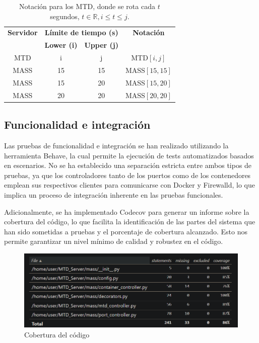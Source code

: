 \begin{table}[h!]
    \centering
    \begin{tabular}{|c|cc|c|}
        \hline
        \textbf{Servidor} & \multicolumn{2}{c|}{\textbf{Límite de tiempo (s)}} & \textbf{Notación} \\ 
        \cline{2-3}
        & \textbf{Lower (i)} & \textbf{Upper (j)} & \\ 
        \hline
        MTD & i & j & MTD$[i,j]$ \\ 
        MASS & 15 & 15 & MASS$[15,15]$ \\ 
        MASS & 15 & 20 & MASS$[15,20]$ \\ 
        MASS & 20 & 20 & MASS$[20,20]$ \\ 
        \hline
    \end{tabular}
    \caption{Notación para los MTD, donde se rota cada $t$ segundos, $t \in \mathbb{R}, i \leq t \leq j$.}
\end{table}

    
\subsection{Funcionalidad e integración}
Las pruebas de funcionalidad e integración se han realizado utilizando la herramienta Behave, la cual permite la ejecución de tests automatizados basados en escenarios. No se ha establecido una separación estricta entre ambos tipos de pruebas, ya que los controladores tanto de los puertos como de los contenedores emplean sus respectivos clientes para comunicarse con Docker y Firewalld, lo que implica un proceso de integración inherente en las pruebas funcionales.

Adicionalmente, se ha implementado Codecov para generar un informe sobre la cobertura del código, lo que facilita la identificación de las partes del sistema que han sido sometidas a pruebas y el porcentaje de cobertura alcanzado. Esto nos permite garantizar un nivel mínimo de calidad y robustez en el código.

\begin{figure}[h]
    \centering
    \includegraphics[width=\linewidth]{./imagenes/coverage.png}
    \caption{Cobertura del código}
\end{figure}


